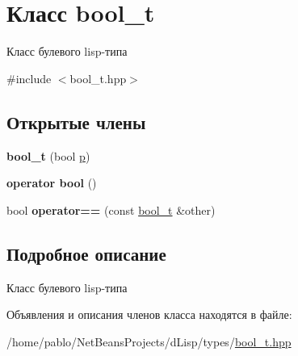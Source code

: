 \hypertarget{classbool__t}{}\section{Класс bool\+\_\+t}
\label{classbool__t}


Класс булевого lisp-\/типа  




{\ttfamily \#include $<$bool\+\_\+t.\+hpp$>$}

\subsection*{Открытые члены}
\begin{DoxyCompactItemize}
\item 
\mbox{\label{classbool__t_aeaf2082068ed76757fc1454a7dfaf194}} 
{\bfseries bool\+\_\+t} (bool \mbox{\hyperlink{func__table__t_8hpp_a2997b2f150bf75a930fa2943a5fc6a35}{p}})
\item 
\mbox{\label{classbool__t_ab24ee0b8899c6c26c8a42d5435590e8a}} 
{\bfseries operator bool} ()
\item 
\mbox{\label{classbool__t_af75ca58c9096d88d8a46a8b48f135e5c}} 
bool {\bfseries operator==} (const \mbox{\hyperlink{classbool__t}{bool\+\_\+t}} \&other)
\end{DoxyCompactItemize}


\subsection{Подробное описание}
Класс булевого lisp-\/типа 

Объявления и описания членов класса находятся в файле\+:\begin{DoxyCompactItemize}
\item 
/home/pablo/\+Net\+Beans\+Projects/d\+Lisp/types/\mbox{\hyperlink{bool__t_8hpp}{bool\+\_\+t.\+hpp}}\end{DoxyCompactItemize}
